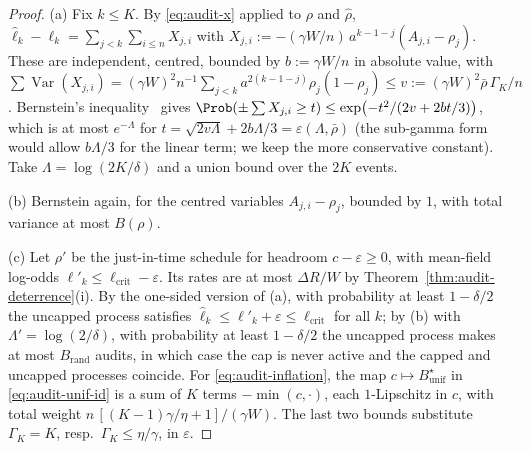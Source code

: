 \begin{proof}
(a) Fix $k\le K$. By \eqref{eq:audit-x} applied to $\rho$ and $\hat\rho$,
$\hat\ell_k-\ell_k=\sum_{j<k}\sum_{i\le n}X_{j,i}$ with
$X_{j,i}:=-(\gamma W/n)\,a^{k-1-j}(A_{j,i}-\rho_j)$. These are independent,
centred, bounded by $b:=\gamma W/n$ in absolute value, with
$\sum\operatorname{Var}(X_{j,i})=(\gamma W)^2n^{-1}\sum_{j<k}a^{2(k-1-j)}\rho_j(1-\rho_j)
\le v:=(\gamma W)^2\bar\rho\,\Gamma_K/n$. Bernstein's
inequality~\cite[Theorem~2.10 and Corollary~2.11, to be checked]{boucheron2013concentration} gives
$\Prob(\pm\sum X_{j,i}\ge t)\le\exp\bigl(-t^2/(2v+2bt/3)\bigr)$, which is at most
$e^{-\Lambda}$ for $t=\sqrt{2v\Lambda}+2b\Lambda/3=\varepsilon(\Lambda,\bar\rho)$ (the sub-gamma form would allow $b\Lambda/3$ for the linear term; we keep the more conservative constant).
Take $\Lambda=\log(2K/\delta)$ and a union bound over the $2K$ events.

(b) Bernstein again, for the centred variables $A_{j,i}-\rho_j$, bounded by $1$,
with total variance at most $B(\rho)$.

(c) Let $\rho'$ be the just-in-time schedule for headroom $c-\varepsilon\ge0$,
with mean-field log-odds $\ell'_k\le\ell_{\mathrm{crit}}-\varepsilon$. Its rates
are at most $\Delta R/W$ by Theorem~\ref{thm:audit-deterrence}(i). By the
one-sided version of (a), with probability at least $1-\delta/2$ the uncapped
process satisfies $\hat\ell_k\le\ell'_k+\varepsilon\le\ell_{\mathrm{crit}}$ for
all $k$; by (b) with $\Lambda'=\log(2/\delta)$, with probability at least
$1-\delta/2$ the uncapped process makes at most $B_{\mathrm{rand}}$ audits, in
which case the cap is never active and the capped and uncapped processes
coincide. For \eqref{eq:audit-inflation}, the map
$c\mapsto B^\star_{\mathrm{unif}}$ in \eqref{eq:audit-unif-id} is a sum of
$K$ terms $-\min(c,\cdot)$, each $1$-Lipschitz in $c$, with total weight
$n\,[(K-1)\gamma/\eta+1]/(\gamma W)$. The last two bounds substitute
$\Gamma_K=K$, resp.\ $\Gamma_K\le\eta/\gamma$, in $\varepsilon$.
\end{proof}

